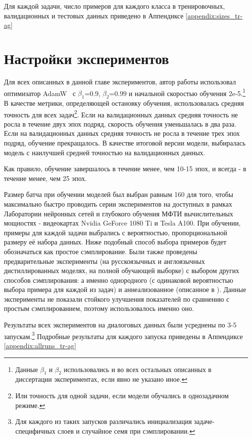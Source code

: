 Для каждой задачи, число примеров для каждого класса в тренировочных, валидационных и тестовых данных приведено в Аппендиксе \ref{appendix:sizes_tr-ag} 

\section {Настройки экспериментов}\label{ch:tr-ag:settings}
Для всех описанных в данной главе экспериментов, автор работы использовал оптимизатор AdamW~\cite{kingma_2014} с  $\beta_1$=0.9, $\beta_2$=0.99 и начальной скоростью обучения 2e-5.\footnote{Данные $\beta_1$ и $\beta_2$ использовались и во всех остальных описанных в диссертации экспериментах, если явно не указано иное.}  В качестве метрики, определяющей остановку обучения, использовалась средняя точность для всех задач\footnote{Или точность для одной задачи, если модели обучались в однозадачном режиме.}. Если на валидационных данных средняя точность не росла в течение двух эпох подряд, скорость обучения уменьшалась в два раза. Если на валидационных данных средняя точность не росла в течение трех эпох подряд, обучение прекращалось. В качестве итоговой версии модели, выбиралась модель с наилучшей средней точностью на валидационных данных.

Как правило, обучение завершалось в течение менее, чем 10-15 эпох, и всегда - в течение менее, чем 25 эпох. 

Размер батча при обучении моделей был выбран равным 160 для того, чтобы максимально быстро проводить серии экспериментов на доступных в рамках Лаборатории нейронных сетей и глубокого обучения МФТИ вычислительных мощностях - видеокартах Nvidia GeForce 1080 Ti и Tesla A100.
При обучении, примеры для каждой задачи выбрались с вероятностью, пропорциональной размеру её набора данных. Ниже подобный способ выбора примеров будет обозначаться как простое сэмплирование. Были также проведены предварительные эксперименты (на русскоязычных и англоязычных дистиллированных моделях, на полной обучающей выборке) с выбором других способов сэмплирования: а именно однородного (с одинаковой вероятностью выбора примера для каждой из задач) и аннеализованное (описанное в \cite{stickland_2019}). Данные эксперименты не показали стойкого улучшения показателей по сравнению с простым сэмплированием, поэтому использовалось именно оно. 

Результаты всех экспериментов на диалоговых данных были усреднены по 3-5 запускам.\footnote{Для каждого из таких запусков различались инициализация задаче-специфичных слоев и случайное семя при сэмплировании.} Подробные результаты для каждого запуска приведены в Аппендиксе \ref{appendix:allruns_tr-ag}

